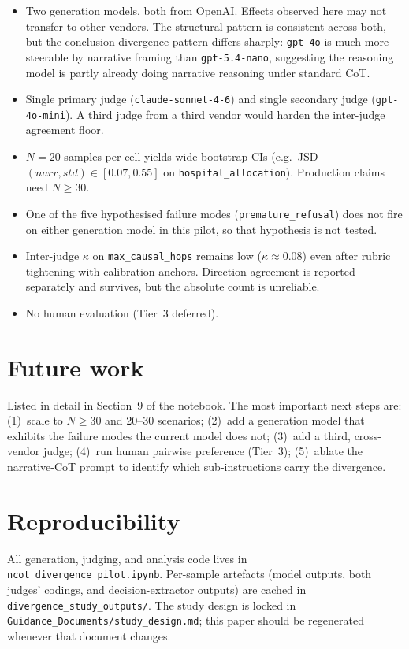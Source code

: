 \documentclass[11pt]{article}
\begin{document}
\begin{itemize}[leftmargin=2em]
  \item Two generation models, both from OpenAI. Effects observed here may
    not transfer to other vendors. The structural pattern is consistent
    across both, but the conclusion-divergence pattern differs sharply:
    \texttt{gpt-4o} is much more steerable by narrative framing than
    \texttt{gpt-5.4-nano}, suggesting the reasoning model is partly already
    doing narrative reasoning under standard CoT.
  \item Single primary judge (\texttt{claude-sonnet-4-6}) and single
    secondary judge (\texttt{gpt-4o-mini}). A third judge from a third
    vendor would harden the inter-judge agreement floor.
  \item $N=20$ samples per cell yields wide bootstrap CIs (e.g.\
    JSD$(narr, std)\in[0.07, 0.55]$ on \texttt{hospital\_allocation}). 
    Production claims need $N \ge 30$.
  \item One of the five hypothesised failure modes
    (\texttt{premature\_refusal}) does not fire on either generation model
    in this pilot, so that hypothesis is not tested.
  \item Inter-judge $\kappa$ on \texttt{max\_causal\_hops} remains low
    ($\kappa \approx 0.08$) even after rubric tightening with calibration
    anchors. Direction agreement is reported separately and survives, but
    the absolute count is unreliable.
  \item No human evaluation (Tier~3 deferred).
\end{itemize}

\section{Future work}

Listed in detail in Section~9 of the notebook. The most important next steps
are: (1)~scale to $N \ge 30$ and 20--30 scenarios; (2)~add a generation model
that exhibits the failure modes the current model does not; (3)~add a third,
cross-vendor judge; (4)~run human pairwise preference (Tier~3); (5)~ablate the
narrative-CoT prompt to identify which sub-instructions carry the
divergence.

\section*{Reproducibility}

All generation, judging, and analysis code lives in
\texttt{ncot\_divergence\_pilot.ipynb}. Per-sample artefacts (model outputs,
both judges' codings, and decision-extractor outputs) are cached in
\texttt{divergence\_study\_outputs/}. The study design is locked in
\texttt{Guidance\_Documents/study\_design.md}; this paper should be
regenerated whenever that document changes.
\end{document}
